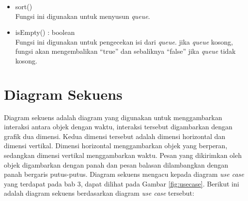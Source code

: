 \begin{itemize}
\begin{itemize}
\begin{itemize}
      \item sort()\\
      Fungsi ini digunakan untuk menyusun \textit{queue}.
      
      \item isEmpty() : boolean\\
      Fungsi ini digunakan untuk pengecekan isi dari \textit{queue}. jika
      \textit{queue} kosong, fungsi akan mengembalikan ``true'' dan sebaliknya
      ``false'' jika \textit{queue} tidak kosong.
    \end{itemize}
  \end{itemize}
\end{itemize}

\section{Diagram Sekuens}
Diagram sekuens adalah diagram yang digunakan untuk menggambarkan interaksi
antara objek dengan waktu, interaksi tersebut digambarkan dengan grafik dua
dimensi. Kedua dimensi tersebut adalah dimensi horizontal dan dimensi vertikal.
Dimensi horizontal menggambarkan objek yang berperan, sedangkan dimensi
vertikal menggambarkan waktu. Pesan yang dikirimkan oleh objek digambarkan
dengan panah dan pesan balasan dilambangkan dengan panah bergaris putus-putus.
Diagram sekuens mengacu kepada diagram \textit{use case} yang
terdapat pada bab 3, dapat dilihat pada Gambar \ref{fig:usecase}. Berikut ini
adalah diagram sekuens berdasarkan diagram \textit{use case} tersebut:
